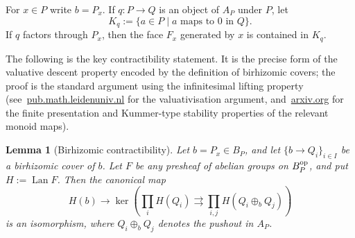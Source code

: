 \documentclass{article}
\newtheorem{lem}[thm]{Lemma}
\theoremstyle{remark}
\DeclareMathOperator{\Lan}{Lan}
\begin{document}
For $x\in P$ write $b=P_x$.  If $q:P\to Q$ is an object of $A_P$ under $P$, let
\[
K_q:=\{a\in P\mid a\text{ maps to }0\text{ in }Q\}.
\]
If $q$ factors through $P_x$, then the face $F_x$ generated by $x$ is contained in $K_q$.

The following is the key contractibility statement.  It is the precise form of the valuative descent property encoded by the definition of birhizomic covers; the proof is the standard argument using the infinitesimal lifting property (see~\href{https://pub.math.leidenuniv.nl/~holmesdst/notes_from_talks/valuativisations_talk.pdf}{pub.math.leidenuniv.nl} for the valuativisation argument, and~\href{https://arxiv.org/pdf/2411.13662}{arxiv.org} for the finite presentation and Kummer-type stability properties of the relevant monoid maps).

\begin{lem}[Birhizomic contractibility]\label{lem:contract}
Let $b=P_x\in B_P$, and let $\{b\to Q_i\}_{i\in I}$ be a birhizomic cover of $b$.  Let $F$ be any presheaf of abelian groups on $B_P^{\rm op}$, and put $H:=\Lan F$.  Then the canonical map
\[
H(b)\longrightarrow
\ker\left(
\prod_i H(Q_i)
\rightrightarrows
\prod_{i,j} H(Q_i\oplus_b Q_j)
\right)
\]
is an isomorphism, where $Q_i\oplus_b Q_j$ denotes the pushout in $A_P$.
\end{lem}
\end{document}
